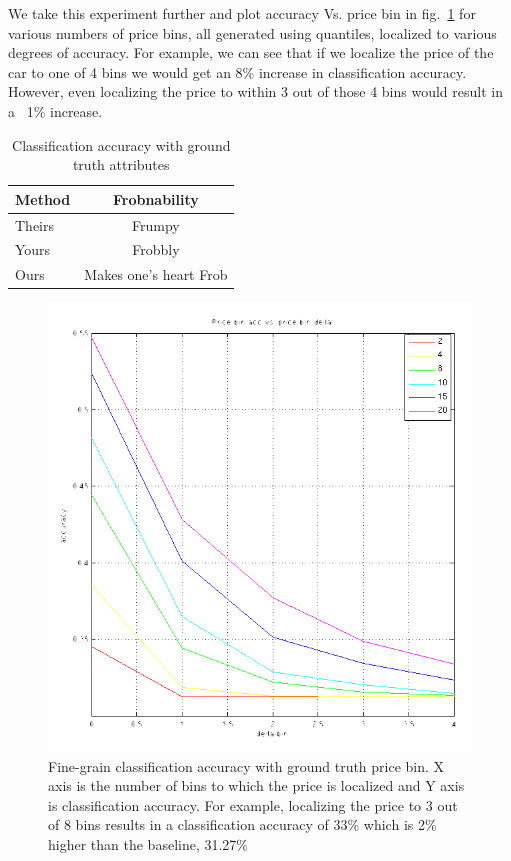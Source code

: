\documentclass[10pt,twocolumn,letterpaper]{article}
\begin{document}
We take this experiment further and plot accuracy Vs. price bin in fig.~\ref{fig:price-acc} for various numbers of price bins, all generated using quantiles, localized to various degrees of accuracy. For example, we can see that if we localize
 the price of the car to one of 4 bins we would get an 8\% increase in classification accuracy. However, even localizing 
the price to within 3 out of those 4 bins would result in a ~1\% increase.


\begin{table}
\begin{center}
\begin{tabular}{|l|c|}
\hline
Method & Frobnability \\
\hline\hline
Theirs & Frumpy \\
Yours & Frobbly \\
Ours & Makes one's heart Frob\\
\hline
\end{tabular}
\end{center}
\caption{Classification accuracy with ground truth attributes}
\label{table:car-att}
\end{table}

\begin{figure}[t]
\begin{center}
\includegraphics[width=0.9\linewidth]{img/price-att.png}
\end{center}
   \caption{Fine-grain classification accuracy with ground truth price bin. X axis is the number of bins to which the price is localized and Y axis is classification accuracy. For example, localizing the price to 3 out of 8 bins results in a classification accuracy of 33\% which is 2\% higher than the baseline, 31.27\%}
\label{fig:price-acc}
\end{figure}
\end{document}
